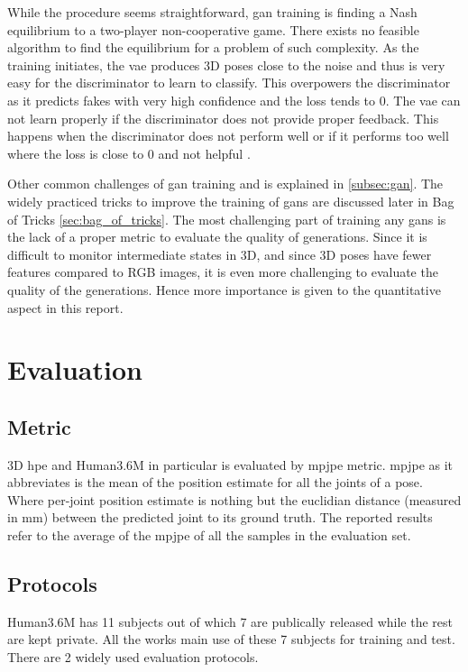 While the procedure seems straightforward, \ac{gan} training is finding a Nash equilibrium to a two-player non-cooperative game. There exists no feasible algorithm to find the equilibrium for a problem of such complexity\cite{improved_gan}. As the training initiates, the \ac{vae} produces 3D poses close to the noise and thus is very easy for the discriminator to learn to classify. This overpowers the discriminator as it predicts fakes with very high confidence and the loss tends to 0. The \ac{vae} can not learn properly if the discriminator does not provide proper feedback. This happens when the discriminator does not perform well or if it performs too well where the loss is close to 0 and not helpful \cite{gan_wgan_tutorial}. 

Other common challenges of \ac{gan} training and is explained in \ref{subsec:gan}. The widely practiced tricks to improve the training of \acp{gan} are discussed later in Bag of Tricks \ref{sec:bag_of_tricks}. The most challenging part of training any \acp{gan} is the lack of a proper metric to evaluate the quality of generations. Since it is difficult to monitor intermediate states in 3D, and since 3D poses have fewer features compared to RGB images, it is even more challenging to evaluate the quality of the generations. Hence more importance is given to the quantitative aspect in this report.



\section{Evaluation} %

\subsection{Metric}
3D \ac{hpe} and Human3.6M in particular is evaluated by \ac{mpjpe} metric. \ac{mpjpe} as it abbreviates is the mean of the position estimate for all the joints of a pose. Where per-joint position estimate is nothing but the euclidian distance (measured in mm) between the predicted joint to its ground truth. The reported results refer to the average of the \ac{mpjpe} of all the samples in the evaluation set. 

\subsection{Protocols}
Human3.6M has 11 subjects out of which 7 are publically released while the rest are kept private. All the works main use of these 7 subjects for training and test. There are 2 widely used evaluation protocols. 

